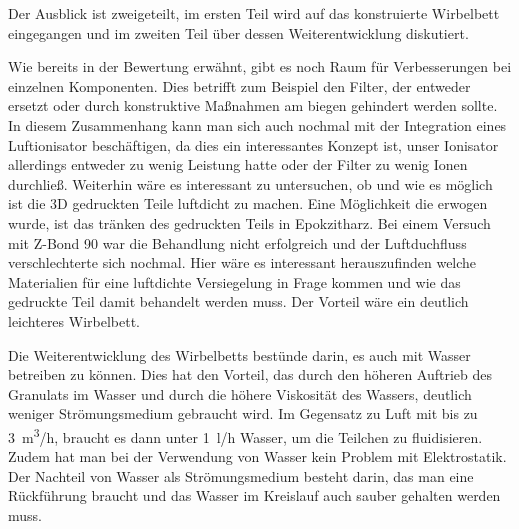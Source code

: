 Der Ausblick ist zweigeteilt, im ersten Teil wird auf das konstruierte Wirbelbett eingegangen und im zweiten Teil über dessen Weiterentwicklung diskutiert. 

Wie bereits in der Bewertung erwähnt, gibt es noch Raum für Verbesserungen bei einzelnen Komponenten. Dies betrifft zum Beispiel den Filter, der entweder ersetzt oder durch konstruktive Maßnahmen am biegen gehindert werden sollte. In diesem Zusammenhang kann man sich auch nochmal mit der Integration eines Luftionisator beschäftigen, da dies ein interessantes Konzept ist, unser Ionisator allerdings entweder zu wenig Leistung hatte oder der Filter zu wenig Ionen durchließ.
Weiterhin wäre es interessant zu untersuchen, ob und wie es möglich ist die 3D gedruckten Teile luftdicht zu machen. Eine Möglichkeit die erwogen wurde, ist das tränken des gedruckten Teils in Epokzitharz. Bei einem Versuch mit Z-Bond 90 war die Behandlung nicht erfolgreich und der Luftduchfluss verschlechterte sich nochmal. Hier wäre es interessant herauszufinden welche Materialien für eine luftdichte Versiegelung in Frage kommen und wie das gedruckte Teil damit behandelt werden muss. Der Vorteil wäre ein deutlich leichteres Wirbelbett.

Die Weiterentwicklung des Wirbelbetts bestünde darin, es auch mit Wasser betreiben zu können. Dies hat den Vorteil, das durch den höheren Auftrieb des Granulats im Wasser und durch die höhere Viskosität des Wassers, deutlich weniger Strömungsmedium gebraucht wird. Im Gegensatz zu Luft mit bis zu \SI{3}{m^3/h}, braucht es dann unter \SI{1}{l/h} Wasser, um die Teilchen zu fluidisieren. Zudem hat man bei der Verwendung von Wasser kein Problem mit Elektrostatik.
Der Nachteil von Wasser als Strömungsmedium besteht darin, das man eine Rückführung braucht und das Wasser im Kreislauf auch sauber gehalten werden muss.


